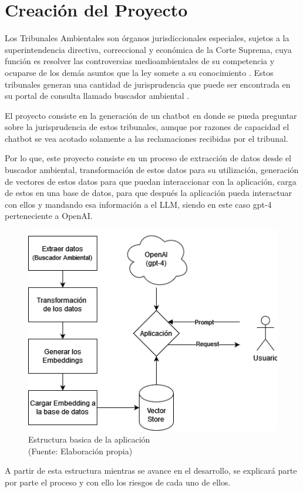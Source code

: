 

\chapter{Creación del Proyecto}


Los Tribunales Ambientales son órganos jurisdiccionales especiales, sujetos a la 
superintendencia directiva, correccional y económica de la Corte Suprema, cuya función 
es resolver las controversias medioambientales de su competencia y ocuparse de los 
demás asuntos que la ley somete a su conocimiento \cite{Ley20600}. Estos tribunales generan una cantidad 
de jurisprudencia que puede ser encontrada en su portal de consulta llamado buscador ambiental \cite{BuscadorAmbiental}. 

El proyecto consiste en la generación de un chatbot en donde se pueda preguntar sobre 
la jurisprudencia de estos tribunales, aunque por razones de capacidad el chatbot se 
vea acotado solamente a las reclamaciones recibidas por el tribunal.

Por lo que, este proyecto consiste en un proceso de extracción de datos 
desde el buscador ambiental, transformación de estos datos para su utilización, generación 
de vectores de estos datos para que puedan interaccionar con la aplicación, carga de estos 
en una base de datos, para que después la aplicación pueda interactuar con ellos y mandando 
esa información a el LLM, siendo en este caso gpt-4 perteneciente a OpenAI.

\begin{figure}[ht!]
    \centering
    \includegraphics[width=.5\textwidth]{figures/huemul1.png}
    \caption[Estructura basica de la aplicación]{Estructura basica de la aplicación\\
    {\scriptsize (Fuente: Elaboración propia)}}
    \label{fig:logoind}
\end{figure}
    

A partir de esta estructura mientras se avance en el desarrollo, se explicará parte por parte el proceso y con ello los riesgos de cada uno de ellos.



